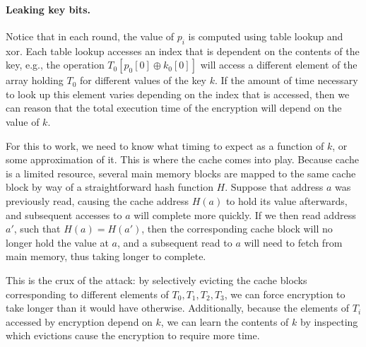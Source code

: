 \documentclass[11pt,twoside]{scrartcl}
\begin{document}
\paragraph{Leaking key bits.} Notice that in each round, the value of $p_i$ is computed using table lookup and xor. Each table lookup accesses an index that is dependent on the contents of the key, e.g., the operation $T_0[p_0[0] \oplus k_0[0]]$ will access a different element of the array holding $T_0$ for different values of the key $k$. If the amount of time necessary to look up this element varies depending on the index that is accessed, then we can reason that the total execution time of the encryption will depend on the value of $k$.

For this to work, we need to know what timing to expect as a function of $k$, or some approximation of it. This is where the cache comes into play. Because cache is a limited resource, several main memory blocks are mapped to the same cache block by way of a straightforward hash function $H$. Suppose that address $a$ was previously read, causing the cache address $H(a)$ to hold its value afterwards, and subsequent accesses to $a$ will complete more quickly. If we then read address $a'$, such that $H(a) = H(a')$, then the corresponding cache block will no longer hold the value at $a$, and a subsequent read to $a$ will need to fetch from main memory, thus taking longer to complete.

This is the crux of the attack: by selectively evicting the cache blocks corresponding to different elements of $T_0, T_1, T_2, T_3$, we can force encryption to take longer than it would have otherwise. Additionally, because the elements of $T_i$ accessed by encryption depend on $k$, we can learn the contents of $k$ by inspecting which evictions cause the encryption to require more time.
\end{document}
